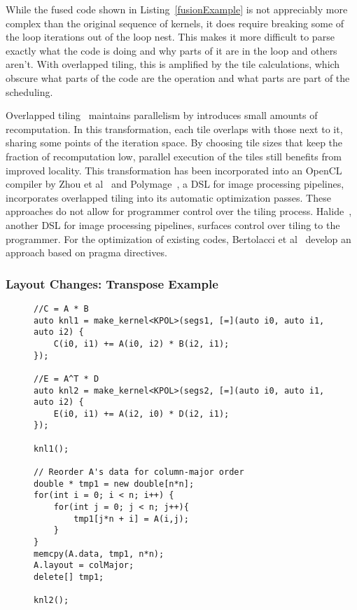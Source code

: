While the fused code shown in Listing~\ref{fusionExample} is not appreciably more complex than the original sequence of kernels, it does require breaking some of the loop iterations out of the loop nest.
This makes it more difficult to parse exactly what the code is doing and why parts of it are in the loop and others aren't.
With overlapped tiling, this is amplified by the tile calculations, which obscure what parts of the code are the operation and what parts are part of the scheduling. 

Overlapped tiling~\cite{holewinski2012high,krishnamoorthy2007effective} maintains parallelism by introduces small amounts of recomputation.
In this transformation, each tile overlaps with those next to it, sharing some points of the iteration space.
By choosing tile sizes that keep the fraction of recomputation low, parallel execution of the tiles still benefits from improved locality.
This transformation has been incorporated into an OpenCL compiler by Zhou et al~\cite{zhou2012hierarchical} and Polymage~\cite{mullapudi2015polymage}, a DSL for image processing pipelines, incorporates overlapped tiling into its automatic optimization passes.
These approaches do not allow for programmer control over the tiling process.
Halide~\cite{ragan-kelley2013halide}, another DSL for image processing pipelines, surfaces control over tiling to the programmer.
For the optimization of existing codes, Bertolacci et al~\cite{bertolacci2019using} develop an approach based on pragma directives.


\subsubsection{Layout Changes: Transpose Example}
\begin{figure}
\begin{lstlisting}[caption={Changing a View's data layout between computations by hand.},label={FormatChangeByHand}]
//C = A * B
auto knl1 = make_kernel<KPOL>(segs1, [=](auto i0, auto i1, auto i2) {
	C(i0, i1) += A(i0, i2) * B(i2, i1);
});

//E = A^T * D
auto knl2 = make_kernel<KPOL>(segs2, [=](auto i0, auto i1, auto i2) {
	E(i0, i1) += A(i2, i0) * D(i2, i1);
});

knl1();

// Reorder A's data for column-major order
double * tmp1 = new double[n*n];
for(int i = 0; i < n; i++) {
	for(int j = 0; j < n; j++){
		tmp1[j*n + i] = A(i,j);
	}
}
memcpy(A.data, tmp1, n*n);
A.layout = colMajor;
delete[] tmp1;

knl2();
\end{lstlisting}
\end{figure}

